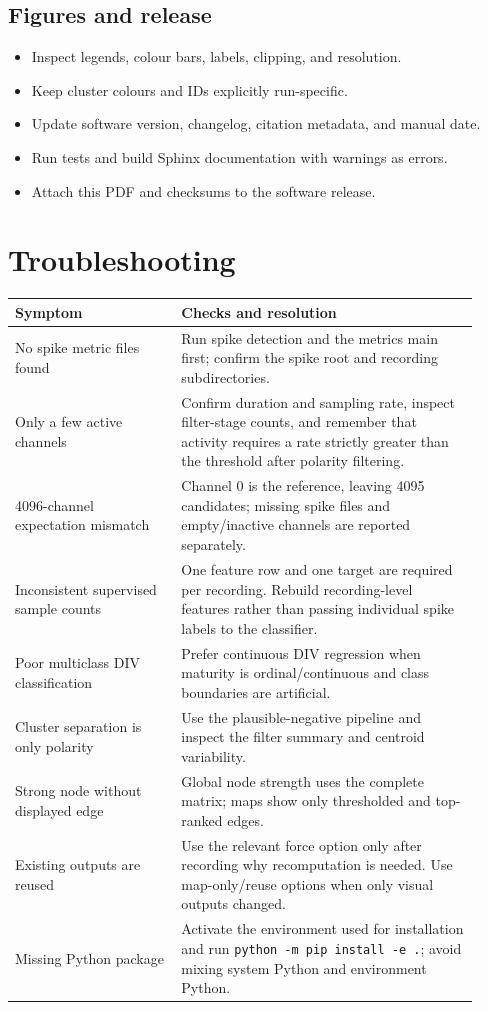 \documentclass[11pt,a4paper]{article}
\newcommand{\code}[1]{\texttt{#1}}
\begin{document}
\subsection{Figures and release}

\begin{itemize}
  \item Inspect legends, colour bars, labels, clipping, and resolution.
  \item Keep cluster colours and IDs explicitly run-specific.
  \item Update software version, changelog, citation metadata, and manual date.
  \item Run tests and build Sphinx documentation with warnings as errors.
  \item Attach this PDF and checksums to the software release.
\end{itemize}

\section{Troubleshooting}

\begin{longtable}{p{0.33\linewidth}p{0.59\linewidth}}
\toprule
Symptom & Checks and resolution \\
\midrule
No spike metric files found & Run spike detection and the metrics main first; confirm the spike root and recording subdirectories. \\
Only a few active channels & Confirm duration and sampling rate, inspect filter-stage counts, and remember that activity requires a rate strictly greater than the threshold after polarity filtering. \\
4096-channel expectation mismatch & Channel 0 is the reference, leaving 4095 candidates; missing spike files and empty/inactive channels are reported separately. \\
Inconsistent supervised sample counts & One feature row and one target are required per recording. Rebuild recording-level features rather than passing individual spike labels to the classifier. \\
Poor multiclass DIV classification & Prefer continuous DIV regression when maturity is ordinal/continuous and class boundaries are artificial. \\
Cluster separation is only polarity & Use the plausible-negative pipeline and inspect the filter summary and centroid variability. \\
Strong node without displayed edge & Global node strength uses the complete matrix; maps show only thresholded and top-ranked edges. \\
Existing outputs are reused & Use the relevant force option only after recording why recomputation is needed. Use map-only/reuse options when only visual outputs changed. \\
Missing Python package & Activate the environment used for installation and run \code{python -m pip install -e .}; avoid mixing system Python and environment Python. \\
\bottomrule
\end{longtable}
\end{document}

